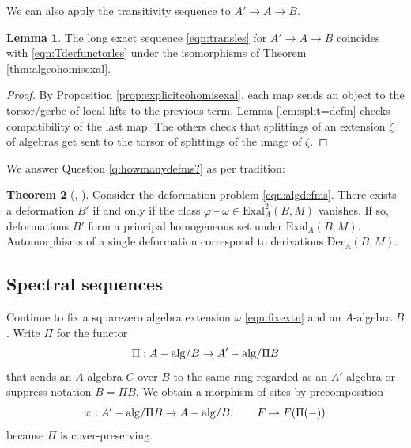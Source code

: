 \documentclass[11pt,reqno]{amsart}
\theoremstyle{definition}
\newtheorem{theorem}{Theorem}[section]
\newtheorem{lemma}[theorem]{Lemma}
\newcommand{\Der}{\textrm{Der}}
\newcommand{\Exal}{\textrm{Exal}}
\newcommand{\Aalg}{A-{\rm alg}}
\newcommand{\AAalg}{A'-{\rm alg}}
\begin{document}
We can also apply the transitivity sequence to $A' \to A \to B$. 


\begin{lemma}
The long exact sequence \eqref{eqn:transles} for $A' \to A \to B$ coincides with \eqref{eqn:Tderfunctorles} under the isomorphisms of Theorem \ref{thm:algcohomisexal}.
\end{lemma}

\begin{proof}

By Proposition \ref{prop:explicitcohomisexal}, each map sends an object to the torsor/gerbe of local lifts to the previous term. Lemma \ref{lem:split=defm} checks compatibility of the last map. The others check that splittings of an extension $\zeta$ of algebras get sent to the torsor of splittings of the image of $\zeta$. 

\end{proof}


We answer Question \ref{q:howmanydefms?} as per tradition:

\begin{theorem}[{\cite[Theorem 4.3.3]{lichtenbaumschlessinger}, \cite[Proposition 2.1.2.3]{illusie1}}]

Consider the deformation problem \eqref{eqn:algdefms}. There exists a deformation $B'$ if and only if the class $\varphi \smile \omega \in \Exal^2_A(B, M)$ vanishes. If so, deformations $B'$ form a principal homogeneous set under $\Exal_A(B, M)$. Automorphisms of a single deformation correspond to derivations $\Der_A(B, M)$. 


\end{theorem}



\subsection{Spectral sequences}


Continue to fix a squarezero algebra extension $\omega$ \eqref{eqn:fixextn} and an $A$-algebra $B$. Write $\Pi$ for the functor
\[\Pi : \Aalg/B \to \AAalg/\Pi B\]
that sends an $A$-algebra $C$ over $B$ to the same ring regarded as an $A'$-algebra or suppress notation $B = \Pi B$. We obtain a morphism of sites by precomposition
\[\pi : \AAalg/\Pi B \to \Aalg/B; \qquad F \mapsto F(\Pi(-))\]
because $\Pi$ is cover-preserving. 
\end{document}

